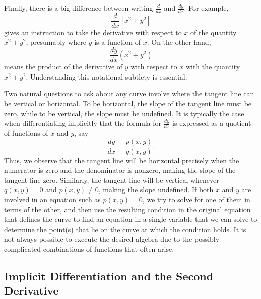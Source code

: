 Finally, there is a big difference between writing $\frac{d}{dx}$ and $\frac{dy}{dx}$.  For example,
$$\frac{d}{dx}[x^2 + y^2]$$
gives an instruction to take the derivative with respect to $x$ of the quantity $x^2 + y^2$, presumably where $y$ is a function of $x$.  On the other hand,
$$\frac{dy}{dx}(x^2 + y^2)$$
means the product of the derivative of $y$ with respect to $x$ with the quantity $x^2 + y^2$.  Understanding this notational subtlety is essential. 





Two natural questions to ask about any curve involve where the tangent line can be vertical or horizontal.  To be horizontal, the slope of the tangent line must be zero, while to be vertical, the slope must be undefined.  It is typically the case when differentiating implicitly that the formula for $\frac{dy}{dx}$ is expressed as a quotient of functions of $x$ and $y$, say
$$\frac{dy}{dx} = \frac{p(x,y)}{q(x,y)}.$$  
Thus, we observe that the tangent line will be horizontal precisely when the numerator is zero and the denominator is nonzero, making the slope of the tangent line zero.  Similarly, the tangent line will be vertical whenever $q(x,y) = 0$ and $p(x,y) \ne 0$, making the slope undefined.  If both $x$ and $y$ are involved in an equation such as $p(x,y) = 0$, we try to solve for one of them in terms of the other, and then use the resulting condition in the original equation that defines the curve to find an equation in a single variable that we can solve to determine the point(s) that lie on the curve at which the condition holds.  It is not always possible to execute the desired algebra due to the possibly complicated combinations of functions that often arise.  


\subsection*{Implicit Differentiation and the Second Derivative}

